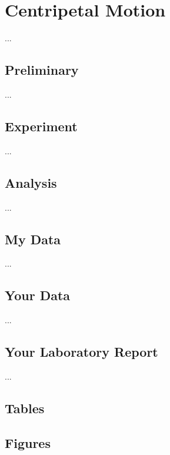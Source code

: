 \setcounter{chapter}{10}
\chapter{Centripetal Motion}
...
\section{Preliminary}
...
\section{Experiment}
...
\section{Analysis}
...
\section{My Data}
...
\section{Your Data}
...
\newpage
\section{Your Laboratory Report}
...
\newpage
\section{Tables}
\FloatBarrier
\newpage
\section{Figures}
